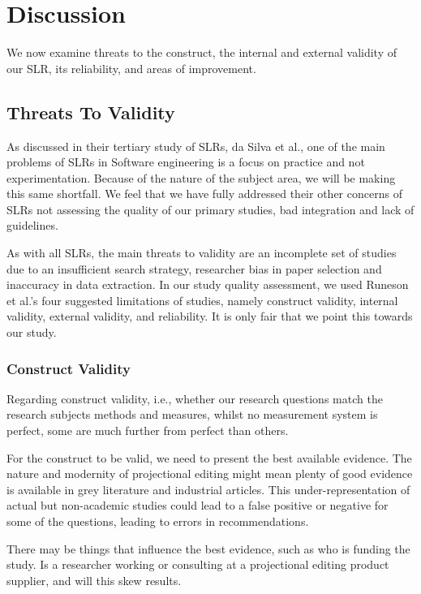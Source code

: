 \section{Discussion}
\label{section:slr_discussion}

We now examine threats to the construct, the internal and external validity of our SLR, its reliability, and areas of improvement.

 
\subsection{Threats To Validity}  
As discussed in their tertiary study of SLRs, da Silva et al.\cite{DaSilvaFabioQ.B2011Syos}, one of the main problems of SLRs in Software engineering is a focus on practice and not experimentation.
Because of the nature of the subject area, we will be making this same shortfall. 
We feel that we have fully addressed their other concerns of SLRs not assessing the quality of our primary studies, bad integration and lack of guidelines.

As with all SLRs, the main threats to validity are an incomplete set of studies due to an insufficient search strategy, researcher bias in paper selection and inaccuracy in data extraction.
In our study quality assessment, we used Runeson et al.'s\cite{runeson2009guidelines} four suggested limitations of studies, namely construct validity, internal validity, external validity, and reliability.
It is only fair that we point this towards our study.

\subsubsection{Construct Validity}
Regarding construct validity, i.e., whether our research questions match the research subjects methods and measures, whilst no measurement system is perfect, some are much further from perfect than others.

For the construct to be valid, we need to present the best available evidence.
The nature and modernity of projectional editing might mean plenty of good evidence is available in grey literature and industrial articles. 
This under-representation of actual but non-academic studies could lead to a false positive or negative for some of the questions, leading to errors in recommendations.

There may be things that influence the best evidence, such as who is funding the study. 
Is a researcher working or consulting at a projectional editing product supplier, and will this skew results.


